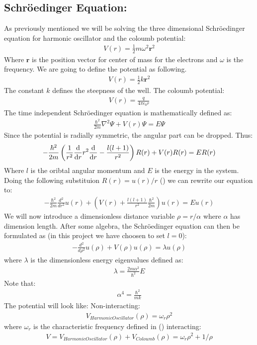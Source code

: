 \documentclass[a4paper, 10pt]{article}
\begin{document}
\subsection{Schröedinger Equation:} As previously mentioned we will be solving the
three dimensional Schröedinger equation for harmonic oscillator and the coloumb potential:
\begin{align}
  V(r) = \frac{1}{2}m\omega^{2}\mathbf{r}^{2}
\end{align}
Where $\mathbf{r}$ is the position vector for center of mass for the electrons and
$\omega$ is the frequency. We are going to define the potential as following.
\begin{align}
  V(r) = \frac{1}{2}k\mathbf{r}^{2}
\end{align}
The constant $k$ defines the steepness of the well. The coloumb potential:
\begin{align}
  V(r) = \frac{q}{4\pi \epsilon_{0}r}
\end{align}
The time independent
Schröedinger equation is mathematically defined as:
\begin{align}
  \frac{\hbar^{2}}{2m}\nabla^{2}\Psi + V(r)\Psi = E\Psi
\end{align}
Since the potential is radially symmetric, the angular part can be dropped.
Thus:
\begin{align}
  -\frac{\hbar^{2}}{2m}\left(\frac{1}{r^{2}}\dv{r}r^{2}\dv{r} -
  \frac{l(l+1)}{r^{2}}\right)R(r) + V(r)R(r) = ER(r)
\end{align}
Where $l$ is the oribtal angular momentum and $E$ is the energy in the system.
Doing the following substituion $R(r) = u(r)/r$ (\cite{gg}) we can rewrite our equation to:
\begin{align}
  -\frac{\hbar^2}{2m}
  \frac{d^2}{dr^2}u(r)+\left(V(r)+
  \frac{l(l+1)}{r^2}\frac{\hbar^2}{2m}\right)u(r)=Eu(r)
\end{align}
We will now introduce a dimensionless distance variable $\rho = r/\alpha$ where
$\alpha$ has dimension length. After some algebra, the Schröedinger equation can then be formulated as
(in this project \cite{p2} we have choosen to set $l = 0$):
\begin{align}
  -\frac{d^2}{d\rho^2}u(\rho)+V(\rho)u(\rho)=\lambda u(\rho)
\end{align}
where $\lambda$ is the dimensionless energy eigenvalues defined as:
\begin{align}
  \lambda = \frac{2m\alpha^{2}}{\hbar^{2}}E
\end{align}
Note that:
\begin{align}
  \alpha^{4} = \frac{\hbar^{2}}{mk}
\end{align}
The potential will look like:
Non-interacting:
\begin{align}
  V_{HarmonicOscillator}(\rho) = \omega_{r}\rho^{2}
\end{align}
where $\omega_{r}$ is the characteristic frequency defined in (\cite{p2})
interacting:
\begin{align}
  V = V_{HarmonicOscillator}(\rho) +   V_{Coloumb}(\rho) = \omega_{r}\rho^{2} + 1/\rho
\end{align}
\end{document}
